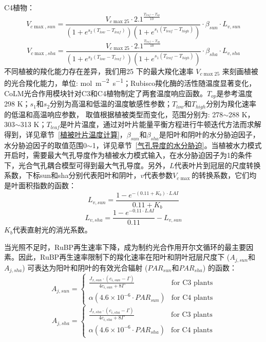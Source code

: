 C4植物：
\begin{equation}\label{V_cmaxsun_b}
V_{c \max,sun }= \frac{V_{c \max 25} \cdot 2.1^{\frac{T_{{leaf }}-T_{o p}}{10}}}{\left(1+e^{s_{2}\left(T_{{low }}
 - T_{{leaf }}\right)}\right)\left(1+e^{s_{1}\left(T_{{leaf }}-T_{h i g h}\right)}\right)} \cdot \beta_{sun} \cdot L_{v,sun}
\end{equation}
\begin{equation}\label{V_cmaxsha_b}
V_{c \max,sha }= \frac{V_{c \max 25} \cdot 2.1^{\frac{T_{{leaf }}-T_{o p}}{10}}}{\left(1+e^{s_{2}\left(T_{{low }}
 - T_{{leaf }}\right)}\right)\left(1+e^{s_{1}\left(T_{{leaf }}-T_{h i g h}\right)}\right)} \cdot \beta_{sha} \cdot L_{v,sha}
\end{equation}
不同植被的羧化能力存在差异，我们用25 \textcelsius 下的最大羧化速率 $V_{c \max 25}$ 来刻画植被的光合羧化能力，单位: \unit{mol.m^{-2}.s^{-1}}；Rubisco羧化酶的活性随温度显著变化，CoLM光合作用模块针对C3和C4植物制定了两套温度响应函数。$T_{op}$是参考温度298 K；$s_1$和$s_2$分别为高温和低温的温度敏感性参数；$T_{low}$和$T_{high}$分别为羧化速率的低温和高温响应参数，
取值根据植被类型而变化，范围分别为: 278$\sim$288 K，303$\sim$313 K；$T_{leaf}$是叶片温度，通过对叶片能量平衡方程进行牛顿迭代方法而求解得到，详见章节~\ref{植被叶片温度计算}，$\beta_{sun}$和$\beta_{sha}$是阳叶和阴叶的水分胁迫因子，水分胁迫因子的取值范围0$\sim$1，详见章节~\ref{气孔导度的水分胁迫}。当植被水力模式开启时，需要最大气孔导度作为植被水力模式输入，在水分胁迫因子为1的条件下，光合气孔耦合模型可得到最大气孔导度。另外，$L$代表叶片到冠层的尺度转换系数，下标sun和sha分别代表阳叶和阴叶，$v$代表参数$V_{c \max}$的转换系数，它们均是叶面积指数的函数：
%
\begin{equation}\label{L_vsun}
L_{v,sun}=\frac{1-e^{-\left(0.11+K_{b}\right) \cdot LAI}}{0.11+K_{b}}
\end{equation}
\begin{equation}\label{L_vsha}
L_{v,sha}=\frac{1-e^{-0.11\cdot LAI}}{0.11} - L_{v,sun}
\end{equation}
$K_{b}$代表直射光的消光系数。

当光照不足时，RuBP再生速率下降，成为制约光合作用开尔文循环的最主要因素。因此，RuBP再生速率限制下的羧化速率在阳叶和阴叶冠层尺度下 ($A_{j,sun}$和$A_{j,sha}$) 可表达为阳叶和阴叶的有效光合辐射 ($PAR_{sun}$和$PAR_{sha}$) 的函数：
\begin{equation}\label{A_J1sun}
A_{j,sun}=\begin{cases}\frac{J_{x,sun}\cdot\left(c_{i,sun}-\Gamma\right)}{4c_{i,sun}+8\Gamma}
     & \text{for C3 plants} \\
\alpha\left(4.6 \times 10^{-6} \cdot PAR_{sun}\right) & \text{for C4 plants}
\end{cases}
\end{equation}
\begin{equation}\label{A_J1sha}
A_{j,sha}=\begin{cases}\frac{J_{x,sha}\cdot\left(c_{i,sha}-\Gamma\right)}{4c_{i,sha}+8\Gamma}
     & \text{for C3 plants} \\
\alpha\left(4.6 \times 10^{-6} \cdot PAR_{sha}\right) & \text{for C4 plants}
\end{cases}
\end{equation}

